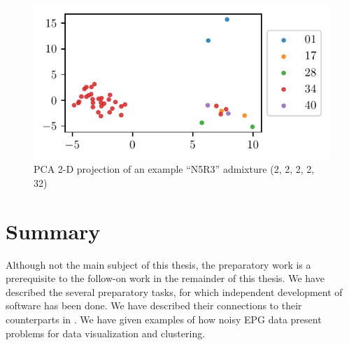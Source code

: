 \begin{figure}
\centering
\includegraphics{./figures/data_visualization/N5R3[0]-PCA, X_heights_normalized_log.pdf}
\caption{PCA 2-D projection of an example ``N5R3'' admixture (2, 2, 2, 2, 32)}
\label{fig:N5R3-PCA}
\end{figure}

\section{Summary}

Although not the main subject of this thesis, the preparatory work is a prerequisite to the follow-on work in the remainder of this thesis. We have described the several preparatory tasks, for which independent development of software has been done. We have described their connections to their counterparts in \cite{odonnell_clustering_2021}. We have given examples of how noisy EPG data present problems for data visualization and clustering.
